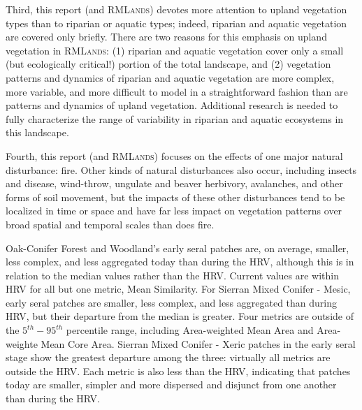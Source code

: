 Third, this report (and \textsc{RMLands}) devotes more attention to upland vegetation types than to riparian or aquatic types; indeed, riparian and aquatic vegetation are covered only briefly. There are two reasons for this emphasis on upland vegetation in \textsc{RMLands}: (1) riparian and aquatic vegetation cover only a small (but ecologically critical!) portion of the total landscape, and (2) vegetation patterns and dynamics of riparian and aquatic vegetation are more complex, more variable, and more difficult to model in a straightforward fashion than are patterns and dynamics of upland vegetation. Additional research is needed to fully characterize the range of variability in riparian and aquatic ecosystems in this landscape. 

Fourth, this report (and \textsc{RMLands}) focuses on the effects of one major natural disturbance: fire. Other kinds of natural disturbances also occur, including insects and disease, wind-throw, ungulate and beaver herbivory, avalanches, and other forms of soil movement, but the impacts of these other disturbances tend to be localized in time or space and have far less impact on vegetation patterns over broad spatial and temporal scales than does fire. 

 Oak-Conifer Forest and Woodland's early seral patches are, on average, smaller, less complex, and less aggregated today than during the HRV, although this is in relation to the median values rather than the HRV. Current values are within HRV for all but one metric, Mean Similarity. For Sierran Mixed Conifer - Mesic, early seral patches are smaller, less complex, and less aggregated than during HRV, but their departure from the median is greater. Four metrics are outside of the $5^{th}-95^{th}$ percentile range, including Area-weighted Mean Area and Area-weighte Mean Core Area. Sierran Mixed Conifer - Xeric patches in the early seral stage show the greatest departure among the three: virtually all metrics are outside the HRV. Each metric is also less than the HRV, indicating that patches today are smaller, simpler and more dispersed and disjunct from one another than during the HRV.

